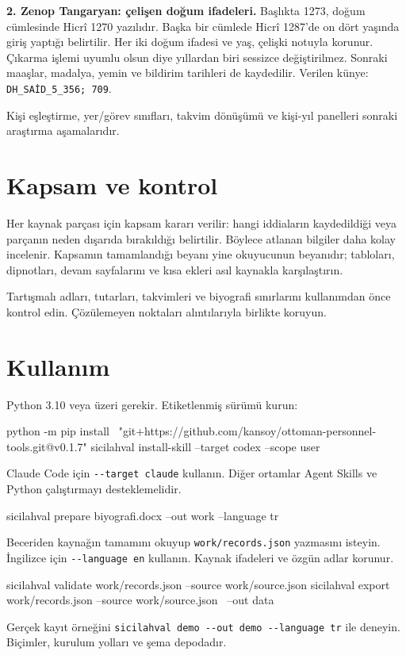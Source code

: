 \documentclass[11pt,a4paper]{article}
\begin{document}
\textbf{2. Zenop Tangaryan: çelişen doğum ifadeleri.}
Başlıkta 1273, doğum cümlesinde Hicrî 1270 yazılıdır. Başka bir cümlede Hicrî 1287'de on dört yaşında giriş yaptığı belirtilir. Her iki doğum ifadesi ve yaş, çelişki notuyla korunur. Çıkarma işlemi uyumlu olsun diye yıllardan biri sessizce değiştirilmez. Sonraki maaşlar, madalya, yemin ve bildirim tarihleri de kaydedilir. Verilen künye: \texttt{DH\_SAİD\_5\_356; 709}.

Kişi eşleştirme, yer/görev sınıfları, takvim dönüşümü ve kişi-yıl panelleri sonraki araştırma aşamalarıdır.

\section{Kapsam ve kontrol}
Her kaynak parçası için kapsam kararı verilir: hangi iddiaların kaydedildiği veya parçanın neden dışarıda bırakıldığı belirtilir. Böylece atlanan bilgiler daha kolay incelenir. Kapsamın tamamlandığı beyanı yine okuyucunun beyanıdır; tabloları, dipnotları, devam sayfalarını ve kısa ekleri asıl kaynakla karşılaştırın.

Tartışmalı adları, tutarları, takvimleri ve biyografi sınırlarını kullanımdan önce kontrol edin. Çözülemeyen noktaları alıntılarıyla birlikte koruyun.

\newpage
\section{Kullanım}
Python 3.10 veya üzeri gerekir. Etiketlenmiş sürümü kurun:
\begin{Code}
python -m pip install \
  "git+https://github.com/kansoy/ottoman-personnel-tools.git@v0.1.7"
sicilahval install-skill --target codex --scope user
\end{Code}
Claude Code için \verb|--target claude| kullanın. Diğer ortamlar Agent Skills ve Python çalıştırmayı desteklemelidir.

\begin{Code}
sicilahval prepare biyografi.docx --out work --language tr
\end{Code}
Beceriden kaynağın tamamını okuyup \texttt{work/records.json} yazmasını isteyin. İngilizce için \verb|--language en| kullanın. Kaynak ifadeleri ve özgün adlar korunur.

\begin{Code}
sicilahval validate work/records.json --source work/source.json
sicilahval export work/records.json --source work/source.json \
  --out data
\end{Code}
Gerçek kayıt örneğini \verb|sicilahval demo --out demo --language tr| ile deneyin. Biçimler, kurulum yolları ve şema depodadır.
\end{document}
